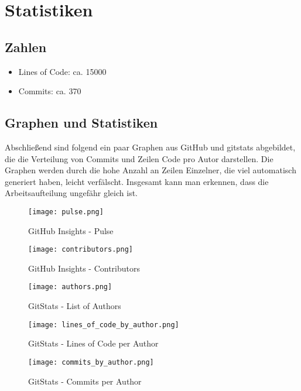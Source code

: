 \chapter{Statistiken}

    \section{Zahlen}
        \begin{itemize}
            \item Lines of Code: ca. 15000
            \item Commits: ca. 370
        \end{itemize}
        
    \section{Graphen und Statistiken}
    Abschließend sind folgend ein paar Graphen aus GitHub und gitstats abgebildet, die die Verteilung von Commits und Zeilen Code pro Autor darstellen. Die Graphen werden durch die hohe Anzahl an Zeilen Einzelner, die viel automatisch generiert haben, leicht verfälscht. Insgesamt kann man erkennen, dass die Arbeitsaufteilung ungefähr gleich ist.

		\begin{figure}[ht] 
			\centering
			\texttt{[image: pulse.png]}
            \caption{GitHub Insights - Pulse}
			\label{fig1}
		\end{figure}

		\begin{figure}[ht] 
			\centering
			\texttt{[image: contributors.png]}
            \caption{GitHub Insights - Contributors}
			\label{fig2}
		\end{figure}

		\begin{figure}[ht] 
    		\centering
			\texttt{[image: authors.png]}
            \caption{GitStats - List of Authors}
			\label{fig3}
		\end{figure}
	
		\begin{figure}[ht] 
			\centering
			\texttt{[image: lines\_of\_code\_by\_author.png]}
            \caption{GitStats - Lines of Code per Author}
			\label{fig4}
		\end{figure}

		\begin{figure}[ht] 
			\centering
			\texttt{[image: commits\_by\_author.png]}
            \caption{GitStats - Commits per Author}	
			\label{fig5}
		\end{figure}
